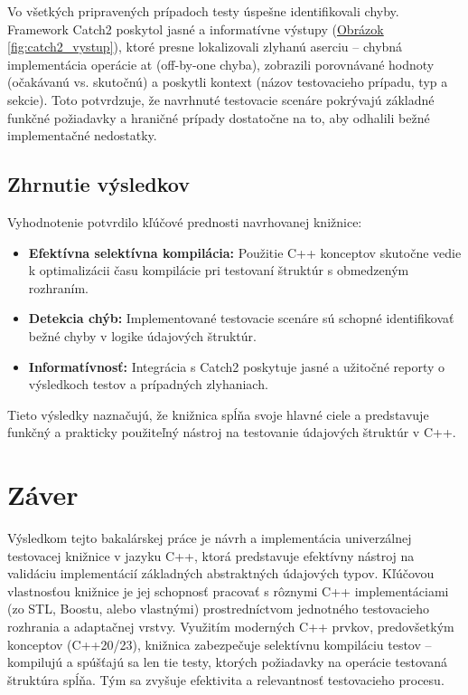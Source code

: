\documentclass[11pt]{article}
\begin{document}
Vo všetkých pripravených prípadoch testy úspešne identifikovali chyby. Framework Catch2 poskytol jasné a informatívne výstupy (\hyperref[fig:catch2_vystup]{Obrázok \ref*{fig:catch2_vystup}}), ktoré presne lokalizovali zlyhanú aserciu -- chybná implementácia operácie at (off-by-one chyba), zobrazili porovnávané hodnoty (očakávanú vs. skutočnú) a poskytli kontext (názov testovacieho prípadu, typ a sekcie). Toto potvrdzuje, že navrhnuté testovacie scenáre pokrývajú základné funkčné požiadavky a hraničné prípady dostatočne na to, aby odhalili bežné implementačné nedostatky.

\subsection{Zhrnutie výsledkov}

Vyhodnotenie potvrdilo kľúčové prednosti navrhovanej knižnice:

\begin{itemize}
    \item \textbf{Efektívna selektívna kompilácia:} Použitie C++ konceptov skutočne vedie k optimalizácii času kompilácie pri testovaní štruktúr s obmedzeným rozhraním.
    \item \textbf{Detekcia chýb:} Implementované testovacie scenáre sú schopné identifikovať bežné chyby v logike údajových štruktúr.
    \item \textbf{Informatívnosť:} Integrácia s Catch2 poskytuje jasné a užitočné reporty o výsledkoch testov a prípadných zlyhaniach.
\end{itemize}

\noindent Tieto výsledky naznačujú, že knižnica spĺňa svoje hlavné ciele a predstavuje funkčný a prakticky použiteľný nástroj na testovanie údajových štruktúr v C++.

\newpage
\section*{Záver}
Výsledkom tejto bakalárskej práce je návrh a implementácia univerzálnej testovacej knižnice v jazyku C++, ktorá predstavuje efektívny nástroj na validáciu implementácií základných abstraktných údajových typov. Kľúčovou vlastnosťou knižnice je jej schopnosť pracovať s rôznymi C++ implementáciami (zo STL, Boostu, alebo vlastnými) prostredníctvom jednotného testovacieho rozhrania a adaptačnej vrstvy. Využitím moderných C++ prvkov, predovšetkým konceptov (C++20/23), knižnica zabezpečuje selektívnu kompiláciu testov -- kompilujú a spúšťajú sa len tie testy, ktorých požiadavky na operácie testovaná štruktúra spĺňa. Tým sa zvyšuje efektivita a relevantnosť testovacieho procesu.
\end{document}
